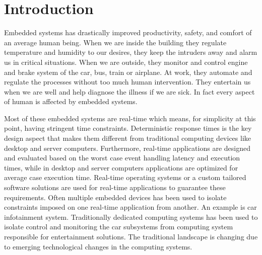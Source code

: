 

\newcommand\moreslaw{Law states that number of transistors on a chip doubles approximately every two years}
\newcommand\IoT{A trend that aims to connect everything to the cloud}
\newcommand\industry{A trend that aims to enable machine to machine communication and connecting machines to cloud}

\chapter{Introduction \label{chap1}}

Embedded systems has drastically improved productivity, safety, and comfort of an average human being.
When we are inside the building they regulate temperature and humidity to our desires, 
they keep the intruders away and alarm us in critical situations. 
When we are outside, they monitor and control engine and brake system of the car, bus, train or airplane.
At work, they automate and regulate the processes without too much human intervention.
They entertain us when we are well and help diagnose the illness if we are sick.
In fact every aspect of human is affected by embedded systems.

Most of these embedded systems are real-time which means, for simplicity at this point, having stringent time constraints.
Deterministic response times is the key design aspect
that makes them different from traditional computing devices like desktop and server computers.
Furthermore, real-time applications are designed and evaluated based on the worst case event handling latency and execution times, while
in desktop and server computers applications are optimized for average case execution time.
Real-time operating systems or a custom tailored software solutions are used for real-time applications to guarantee these requirements.
Often multiple embedded devices has been used to isolate constraints imposed on one real-time application from another.
An example is car infotainment system. Traditionally dedicated computing systems has been used to isolate 
control and monitoring the car subsystems from computing system responsible for entertainment solutions.
The traditional landscape is changing due to emerging technological changes in the computing systems.


